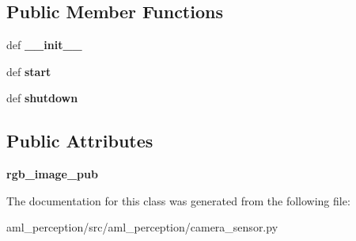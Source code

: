 \subsection*{Public Member Functions}
\begin{DoxyCompactItemize}
\item 
\hypertarget{classaml__perception_1_1camera__sensor_1_1_camera_sensor_a21adf5c3740d47e8fb55c932e924618d}{def {\bfseries \-\_\-\-\_\-init\-\_\-\-\_\-}}\label{classaml__perception_1_1camera__sensor_1_1_camera_sensor_a21adf5c3740d47e8fb55c932e924618d}

\item 
\hypertarget{classaml__perception_1_1camera__sensor_1_1_camera_sensor_a08a06c82a0528c0462a49ec93db4dc0b}{def {\bfseries start}}\label{classaml__perception_1_1camera__sensor_1_1_camera_sensor_a08a06c82a0528c0462a49ec93db4dc0b}

\item 
\hypertarget{classaml__perception_1_1camera__sensor_1_1_camera_sensor_a95227671ed4cf14c09493d81bc619ea7}{def {\bfseries shutdown}}\label{classaml__perception_1_1camera__sensor_1_1_camera_sensor_a95227671ed4cf14c09493d81bc619ea7}

\end{DoxyCompactItemize}
\subsection*{Public Attributes}
\begin{DoxyCompactItemize}
\item 
\hypertarget{classaml__perception_1_1camera__sensor_1_1_camera_sensor_af2ce3908d0143e32e9bc38d087440873}{{\bfseries rgb\-\_\-image\-\_\-pub}}\label{classaml__perception_1_1camera__sensor_1_1_camera_sensor_af2ce3908d0143e32e9bc38d087440873}

\end{DoxyCompactItemize}


The documentation for this class was generated from the following file\-:\begin{DoxyCompactItemize}
\item 
aml\-\_\-perception/src/aml\-\_\-perception/camera\-\_\-sensor.\-py\end{DoxyCompactItemize}

